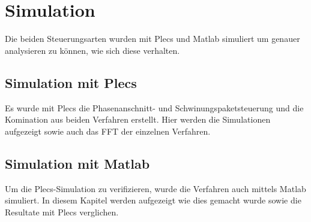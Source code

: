 \section{Simulation}
Die beiden Steuerungsarten wurden mit Plecs und Matlab simuliert um genauer analysieren zu können, wie sich diese verhalten. 

\subsection{Simulation mit Plecs}
Es wurde mit Plecs die Phasenanschnitt- und Schwinungspaketsteuerung und die Komination aus beiden Verfahren erstellt. Hier werden die Simulationen aufgezeigt sowie auch das FFT der einzelnen Verfahren.

\subsection{Simulation mit Matlab}
Um die Plecs-Simulation zu verifizieren, wurde die Verfahren auch mittels Matlab simuliert. In diesem Kapitel werden aufgezeigt wie dies gemacht wurde sowie die Resultate mit Plecs verglichen. 